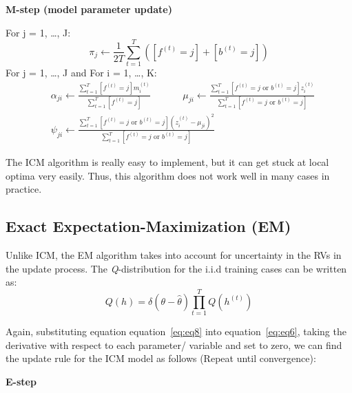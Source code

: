 \documentclass{article} %
\begin{document}
\textbf{M-step (model parameter update)}

For j = 1, \ldots , J: 
\begin{equation*}
\pi_j \leftarrow \frac{1}{2T}\sum_{t=1}^T([f^{(t)} = j] + [b^{(t)} = j])
\end{equation*}
For j = 1, \ldots , J and For i = 1, \ldots , K: 
\begin{align*} 
&\alpha_{ji} \leftarrow \frac{\sum_{t=1}^T [f^{(t)} = j]m_i^{(t)}}{\sum_{t=1}^T [f^{(t)} = j]} \text{ }\text{ }\text{ }\text{ }\text{ }\mu_{ji} \leftarrow \frac{\sum_{t=1}^T [f^{(t)} = j \text{ or } b^{(t)} = j ]z_i^{(t)}}{\sum_{t=1}^T [f^{(t)} = j \text{ or } b^{(t)} = j]} \\
&\psi_{ji} \leftarrow \frac{\sum_{t=1}^T [f^{(t)} = j \text{ or } b^{(t)} = j ](z_i^{(t)}-\mu_{ji})^2}{\sum_{t=1}^T [f^{(t)} = j \text{ or } b^{(t)} = j]} 
\end{align*} 

The ICM algorithm is really easy to implement, but it can get stuck at local optima very easily. Thus, this algorithm does not work well in many cases in practice.

\subsection{Exact Expectation-Maximization (EM)}
\label{exact_em}

Unlike ICM, the EM algorithm takes into account for uncertainty in the RVs in the update process. The \textit{Q}-distribution for the i.i.d training cases can be written as:
\begin{equation}
Q(h) = \delta(\theta-\hat{\theta})\prod_{t=1}^TQ(h^{(t)})
\label{eq:eq8}
\end{equation}

Again, substituting equation equation~\ref{eq:eq8} into equation~\ref{eq:eq6}, taking the derivative with respect to each parameter/ variable and set to zero, we can find the update rule for the ICM model as follows (Repeat until convergence):

\textbf{E-step}
\end{document}
